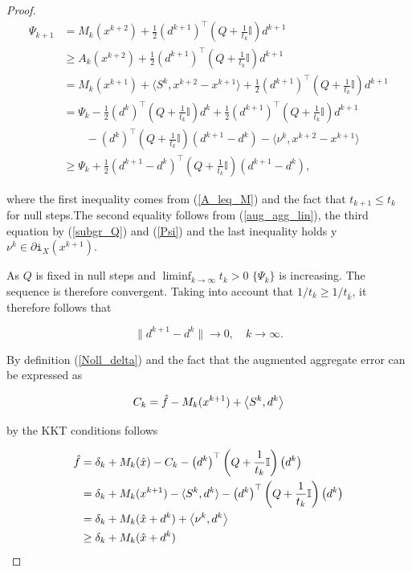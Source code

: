 \begin{proof}
	\begin{align*}
		\Psi_{k+1} &= M_k(x^{k+2})+\frac{1}{2}\left(d^{k+1}\right)^{\top}\left(Q+\frac{1}{t_k}\mathbb{I} \right)d^{k+1} \\
		&\geq A_k(x^{k+2})+\frac{1}{2}\left(d^{k+1}\right)^{\top}\left(Q+\frac{1}{t_k}\mathbb{I}\right)d^{k+1} \\
		&= M_k(x^{k+1})+\langle S^k,x^{k+2}-x^{k+1} \rangle +\frac{1}{2}\left(d^{k+1}\right)^{\top}\left(Q+\frac{1}{t_k}\mathbb{I}\right)d^{k+1} \\
		&= \Psi_k - \frac{1}{2}\left(d^{k}\right)^{\top}\left(Q+\frac{1}{t_k}\mathbb{I}\right)d^{k} + \frac{1}{2}\left(d^{k+1}\right)^{\top}\left(Q+\frac{1}{t_k}\mathbb{I}\right)d^{k+1} \\
		& \qquad -\left(d^{k}\right)^{\top}\left(Q+\frac{1}{t_k}\mathbb{I}\right)\left(d^{k+1} - d^{k}\right) - \langle \nu^k, x^{k+2}-x^{k+1}\rangle\\
		&\geq \Psi_k + \frac{1}{2}\left(d^{k+1}-d^{k}\right)^{\top}\left(Q+\frac{1}{t_k}\mathbb{I}\right)\left(d^{k+1} - d^{k}\right),
	\end{align*}
	
where the first inequality comes from (\ref{A_leq_M}) and the fact that \(t_{k+1} \leq t_{k}\) for null steps.The second equality follows from (\ref{aug_agg_lin}), the third equation by (\ref{subgr_Q}) and (\ref{Psi}) and the last inequality holds y \(\nu^k \in \partial \mathtt{i}_X(x^{k+1})\).

As \(Q\) is fixed in null steps and \(\liminf_{k \to \infty} t_k > 0\) \(\{\Psi_k\}\) is increasing. The sequence is therefore convergent.
Taking into account that \(1/t_k \geq 1/t_{\bar{k}}\), it therefore follows that

\begin{equation}
	\|d^{k+1}-d^k\| \to 0, \quad k \to \infty.
\label{d_to_0}
\end{equation}

By definition (\ref{Noll_delta}) and the fact that the augmented aggregate error can be expressed as

\begin{equation*}
	C_k = \hat{f}-M_k(x^{k+1})+\left\langle S^k,d^k \right\rangle 
\end{equation*}

by the KKT conditions follows

\begin{align*}
	\hat{f} &= \delta_k+M_k(\hat{x})-C_k-\left(d^{k}\right)^{\top}\left(Q+\frac{1}{t_k}\mathbb{I}\right)\left(d^{k}\right) \\
	&= \delta_k + M_k(x^{k+1})-\langle S^k,d^k \rangle-\left(d^{k}\right)^{\top}\left(Q+\frac{1}{t_k}\mathbb{I}\right)\left(d^{k}\right)  \\
	&= \delta_k + M_k(\hat{x}+d^k)+\left\langle \nu^k, d^k \right\rangle\\
	&\geq \delta_k+M_k(\hat{x}+d^k)
\end{align*}


\end{proof}
